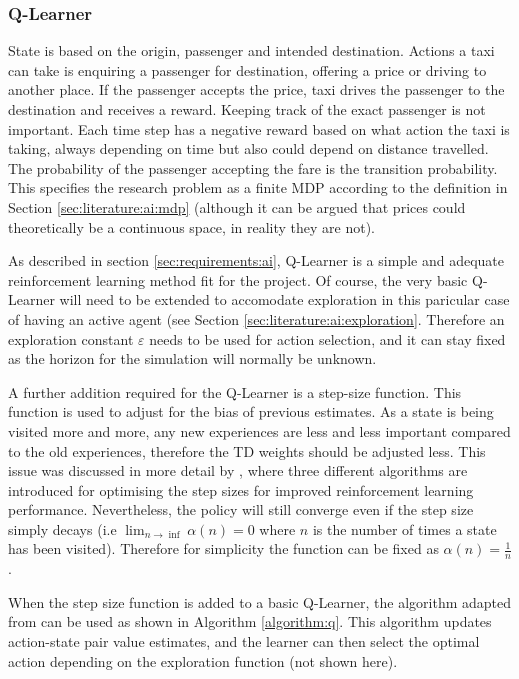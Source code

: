 

\subsubsection{Q-Learner}
\label{sec:design:ai}

State is based on the origin, passenger and intended destination. Actions a
taxi can take is enquiring a passenger for destination, offering a price or
driving to another place. If the passenger accepts the price, taxi drives the
passenger to the destination and receives a reward. Keeping track of the exact
passenger is not important. Each time step has a negative reward based on what
action the taxi is taking, always depending on time but also could depend on
distance travelled. The probability of the passenger accepting the fare is the
transition probability. This specifies the research problem as a finite MDP
according to the definition in Section \ref{sec:literature:ai:mdp} (although it
can be argued that prices could theoretically be a continuous space, in reality
they are not).

As described in section \ref{sec:requirements:ai}, Q-Learner is a simple and
adequate reinforcement learning method fit for the project. Of course, the very
basic Q-Learner will need to be extended to accomodate exploration in this
paricular case of having an active agent (see Section
\ref{sec:literature:ai:exploration}. Therefore an exploration constant
\(\varepsilon\) needs to be used for action selection, and it can stay fixed as
the horizon for the simulation will normally be unknown.

A further addition required for the Q-Learner is a step-size function. This
function is used to adjust for the bias of previous estimates. As a state is
being visited more and more, any new experiences are less and less important
compared to the old experiences, therefore the TD weights should be adjusted
less. This issue was discussed in more detail by
\textcite{Sutton1994ai+stepsize}, where three different algorithms are
introduced for optimising the step sizes for improved reinforcement learning
performance. Nevertheless, the policy will still converge even if the step size
simply decays (i.e \(\lim_{n \to \inf}\alpha(n) = 0\) where \(n\) is the number
of times a state has been visited). Therefore for simplicity the function can
be fixed as \(\alpha(n)=\frac{1}{n}\).

When the step size function is added to a basic Q-Learner, the algorithm
adapted from \textcite{Sutton1998ai+reinforcement} can be used as shown in
Algorithm \ref{algorithm:q}. This algorithm updates action-state pair value
estimates, and the learner can then select the optimal action depending on the
exploration function (not shown here).

